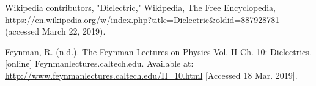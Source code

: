 \documentclass[a4paper,12pt,twoside]{article}
\begin{document}
  \newpage
  \begin{thebibliography}{99}
     Wikipedia contributors, "Dielectric," Wikipedia, The Free Encyclopedia, \url{https://en.wikipedia.org/w/index.php?title=Dielectric&oldid=887928781} (accessed March 22, 2019).

     Feynman, R. (n.d.). The Feynman Lectures on Physics Vol. II Ch. 10: Dielectrics. [online] Feynmanlectures.caltech.edu. Available at: \url{http://www.feynmanlectures.caltech.edu/II_10.html} [Accessed 18 Mar. 2019].
  \end{thebibliography}
\end{document}
